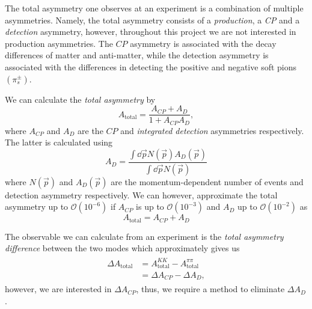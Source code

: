 \documentclass{article}
\begin{document}
        The total asymmetry one observes at an experiment is a combination of multiple asymmetries.
        Namely, the total asymmetry consists of a \textit{production}, a \textit{CP} and a \textit{detection} asymmetry, however, throughout this project we are not interested in production asymmetries.
        The $CP$ asymmetry is associated with the decay differences of matter and anti-matter, while the detection asymmetry is associated with the differences in detecting the positive and negative soft pions $(\pi_s^\pm)$.
        
        We can calculate the \textit{total asymmetry} by
        \begin{equation}
                A_\text{total} = \frac{A_{CP} + A_D}{1 + A_{CP}A_D},
        \end{equation}
        where $A_{CP}$ and $A_D$ are the $CP$ and \textit{integrated detection} asymmetries respectively.
        The latter is calculated using
        \begin{equation}
                A_D = \frac{\int \dd \vec{p} N(\vec{p})A_D(\vec{p})}{\int \dd \vec{p} N(\vec{p})}
        \end{equation}
        where $N(\vec{p})$ and $A_D(\vec{p})$ are the momentum-dependent number of events and detection asymmetry respectively.
        We can however, approximate the total asymmetry up to $\mathcal{O}(10^{-6})$ if $A_{CP}$ is up to $\mathcal{O}(10^{-3})$ and $A_D$ up to $\mathcal{O}(10^{-2})$ as
        \begin{equation}
                A_\text{total} = A_{CP} + A_{D}
        \end{equation}

        The observable we can calculate from an experiment is the \textit{total asymmetry difference} between the two modes which approximately gives us
        \begin{eqnarray}
                \begin{split}
                        \Delta A_\text{total} & = A^{KK}_\text{total} - A^{\pi\pi}_\text{total}\\
                        & = \Delta A_{CP} - \Delta A_D,
                \end{split}
        \end{eqnarray}
        however, we are interested in $\Delta A_{CP}$, thus, we require a method to eliminate $\Delta A_D$.
\end{document}
